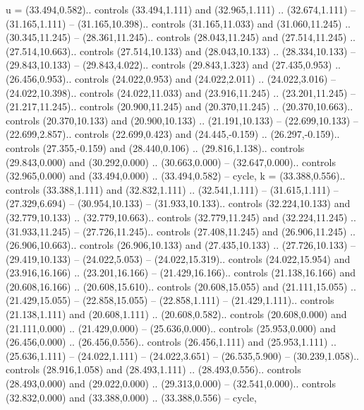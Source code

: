 {u} = {(33.494,0.582).. controls (33.494,1.111) and (32.965,1.111) .. (32.674,1.111) -- (31.165,1.111) -- (31.165,10.398).. controls (31.165,11.033) and (31.060,11.245) .. (30.345,11.245) -- (28.361,11.245).. controls (28.043,11.245) and (27.514,11.245) .. (27.514,10.663).. controls (27.514,10.133) and (28.043,10.133) .. (28.334,10.133) -- (29.843,10.133) -- (29.843,4.022).. controls (29.843,1.323) and (27.435,0.953) .. (26.456,0.953).. controls (24.022,0.953) and (24.022,2.011) .. (24.022,3.016) -- (24.022,10.398).. controls (24.022,11.033) and (23.916,11.245) .. (23.201,11.245) -- (21.217,11.245).. controls (20.900,11.245) and (20.370,11.245) .. (20.370,10.663).. controls (20.370,10.133) and (20.900,10.133) .. (21.191,10.133) -- (22.699,10.133) -- (22.699,2.857).. controls (22.699,0.423) and (24.445,-0.159) .. (26.297,-0.159).. controls (27.355,-0.159) and (28.440,0.106) .. (29.816,1.138).. controls (29.843,0.000) and (30.292,0.000) .. (30.663,0.000) -- (32.647,0.000).. controls (32.965,0.000) and (33.494,0.000) .. (33.494,0.582) -- cycle},
{k} = {(33.388,0.556).. controls (33.388,1.111) and (32.832,1.111) .. (32.541,1.111) -- (31.615,1.111) -- (27.329,6.694) -- (30.954,10.133) -- (31.933,10.133).. controls (32.224,10.133) and (32.779,10.133) .. (32.779,10.663).. controls (32.779,11.245) and (32.224,11.245) .. (31.933,11.245) -- (27.726,11.245).. controls (27.408,11.245) and (26.906,11.245) .. (26.906,10.663).. controls (26.906,10.133) and (27.435,10.133) .. (27.726,10.133) -- (29.419,10.133) -- (24.022,5.053) -- (24.022,15.319).. controls (24.022,15.954) and (23.916,16.166) .. (23.201,16.166) -- (21.429,16.166).. controls (21.138,16.166) and (20.608,16.166) .. (20.608,15.610).. controls (20.608,15.055) and (21.111,15.055) .. (21.429,15.055) -- (22.858,15.055) -- (22.858,1.111) -- (21.429,1.111).. controls (21.138,1.111) and (20.608,1.111) .. (20.608,0.582).. controls (20.608,0.000) and (21.111,0.000) .. (21.429,0.000) -- (25.636,0.000).. controls (25.953,0.000) and (26.456,0.000) .. (26.456,0.556).. controls (26.456,1.111) and (25.953,1.111) .. (25.636,1.111) -- (24.022,1.111) -- (24.022,3.651) -- (26.535,5.900) -- (30.239,1.058).. controls (28.916,1.058) and (28.493,1.111) .. (28.493,0.556).. controls (28.493,0.000) and (29.022,0.000) .. (29.313,0.000) -- (32.541,0.000).. controls (32.832,0.000) and (33.388,0.000) .. (33.388,0.556) -- cycle},

